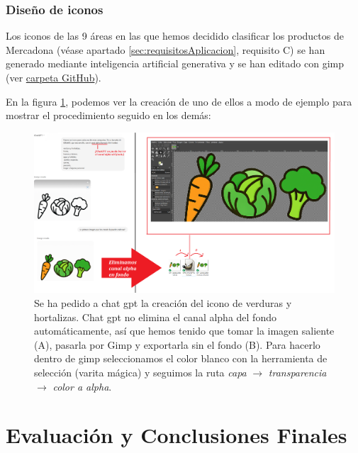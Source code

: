 \documentclass[a4paper,12pt]{report}
\begin{document}
	
	\subsection{Diseño de iconos}
	
	Los iconos de las 9 áreas en las que hemos decidido clasificar los productos de Mercadona (véase apartado \ref{sec:requisitosAplicacion}, requisito C) se han generado mediante inteligencia artificial generativa y se han editado con gimp (ver \href{https://github.com/blackcub3s/mercApp/tree/main/creacioIconos/categoriesProductes}{carpeta GitHub}).
	
	
	En la figura \ref{fig:eliminocanalalpha}, podemos ver la creación de uno de ellos a modo de ejemplo para mostrar el procedimiento seguido en los demás:

	
	
	
\FloatBarrier
\setlength{\belowcaptionskip}{3pt}
\begin{figure}[H]
	\centering
	\includegraphics[width=1\linewidth]{img/eliminoCanalAlpha}
	\caption{Se ha pedido a chat gpt la creación del icono de verduras y hortalizas. Chat gpt no elimina el canal alpha del fondo automáticamente, así que hemos tenido que tomar la imagen saliente (A), pasarla por Gimp y exportarla  sin el fondo (B). Para hacerlo dentro de gimp seleccionamos el color blanco con la herramienta de selección (varita mágica) y seguimos la ruta \textit{capa} $\rightarrow$ \textit{transparencia} $\rightarrow$ \textit{color a alpha}.}

	\label{fig:eliminocanalalpha}
\end{figure}
\FloatBarrier
	
		
		
	\chapter{Evaluación y Conclusiones Finales} %
	
\end{document}
